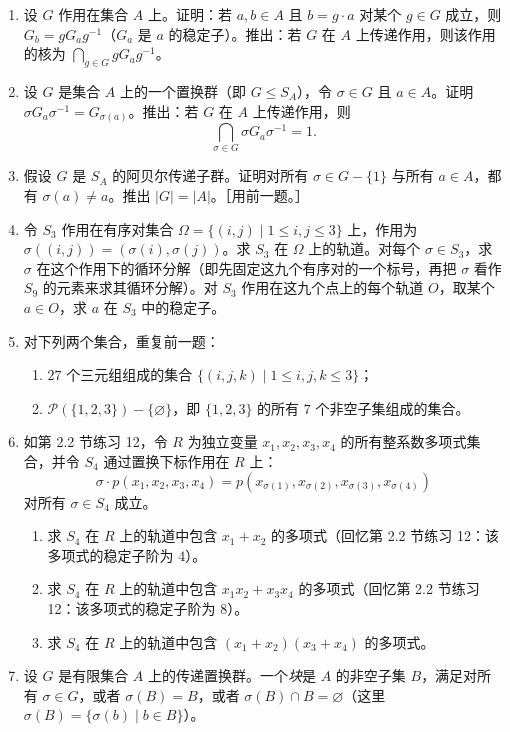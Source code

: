 \begin{enumerate}[label=\arabic*.]
  \item 设 $G$ 作用在集合 $A$ 上。证明：若 $a,b\in A$ 且 $b=g\cdot a$ 对某个 $g\in G$ 成立，则 $G_b=gG_ag^{-1}$（$G_a$ 是 $a$ 的稳定子）。推出：若 $G$ 在 $A$ 上传递作用，则该作用的核为 $\bigcap_{g\in G}gG_ag^{-1}$。
  \item 设 $G$ 是集合 $A$ 上的一个置换群（即 $G\leq S_A$），令 $\sigma\in G$ 且 $a\in A$。证明 $\sigma G_a\sigma^{-1}=G_{\sigma(a)}$。推出：若 $G$ 在 $A$ 上传递作用，则
  \[
    \bigcap_{\sigma\in G}\sigma G_a\sigma^{-1}=1.
  \]
  \item 假设 $G$ 是 $S_A$ 的阿贝尔传递子群。证明对所有 $\sigma\in G-\{1\}$ 与所有 $a\in A$，都有 $\sigma(a)\neq a$。推出 $|G|=|A|$。［用前一题。］
  \item 令 $S_3$ 作用在有序对集合 $\Omega=\{(i,j)\mid 1\leq i,j\leq 3\}$ 上，作用为 $\sigma((i,j))=(\sigma(i),\sigma(j))$。求 $S_3$ 在 $\Omega$ 上的轨道。对每个 $\sigma\in S_3$，求 $\sigma$ 在这个作用下的循环分解（即先固定这九个有序对的一个标号，再把 $\sigma$ 看作 $S_9$ 的元素来求其循环分解）。对 $S_3$ 作用在这九个点上的每个轨道 $O$，取某个 $a\in O$，求 $a$ 在 $S_3$ 中的稳定子。
  \item 对下列两个集合，重复前一题：
  \begin{enumerate}[label=(\alph*)]
    \item $27$ 个三元组组成的集合 $\{(i,j,k)\mid 1\leq i,j,k\leq 3\}$；
    \item $\mathcal P(\{1,2,3\})-\{\varnothing\}$，即 $\{1,2,3\}$ 的所有 $7$ 个非空子集组成的集合。
  \end{enumerate}
  \item 如第 2.2 节练习 12，令 $R$ 为独立变量 $x_1,x_2,x_3,x_4$ 的所有整系数多项式集合，并令 $S_4$ 通过置换下标作用在 $R$ 上：
  \[
    \sigma\cdot p(x_1,x_2,x_3,x_4)=p(x_{\sigma(1)},x_{\sigma(2)},x_{\sigma(3)},x_{\sigma(4)})
  \]
  对所有 $\sigma\in S_4$ 成立。
  \begin{enumerate}[label=(\alph*)]
    \item 求 $S_4$ 在 $R$ 上的轨道中包含 $x_1+x_2$ 的多项式（回忆第 2.2 节练习 12：该多项式的稳定子阶为 $4$）。
    \item 求 $S_4$ 在 $R$ 上的轨道中包含 $x_1x_2+x_3x_4$ 的多项式（回忆第 2.2 节练习 12：该多项式的稳定子阶为 $8$）。
    \item 求 $S_4$ 在 $R$ 上的轨道中包含 $(x_1+x_2)(x_3+x_4)$ 的多项式。
  \end{enumerate}
  \item 设 $G$ 是有限集合 $A$ 上的传递置换群。一个\emph{块}是 $A$ 的非空子集 $B$，满足对所有 $\sigma\in G$，或者 $\sigma(B)=B$，或者 $\sigma(B)\cap B=\varnothing$（这里 $\sigma(B)=\{\sigma(b)\mid b\in B\}$）。

\end{enumerate}
